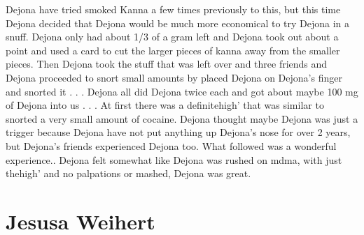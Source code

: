 \documentclass[12pt]{book}
\begin{document}
Dejona have tried smoked Kanna a few times previously to this, but this time Dejona decided that Dejona would be much more economical to try Dejona in a snuff. Dejona only had about 1/3 of a gram left and Dejona took out about a point and used a card to cut the larger pieces of kanna away from the smaller pieces. Then Dejona took the stuff that was left over and three friends and Dejona proceeded to snort small amounts by placed Dejona on Dejona's finger and snorted it . . .  Dejona all did Dejona twice each and got about maybe 100 mg of Dejona into us . . .  At first there was a definitehigh' that was similar to snorted a very small amount of cocaine. Dejona thought maybe Dejona was just a trigger because Dejona have not put anything up Dejona's nose for over 2 years, but Dejona's friends experienced Dejona too. What followed was a wonderful experience.. Dejona felt somewhat like Dejona was rushed on mdma, with just thehigh' and no palpations or mashed, Dejona was great.



\chapter{Jesusa Weihert}
\end{document}

